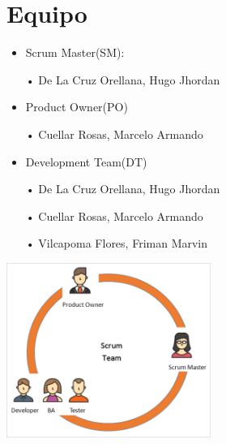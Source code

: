 
\chapter{Equipo}

\begin{itemize}
\item Scrum Master(SM):

	• De La Cruz Orellana, Hugo Jhordan  
\item Product Owner(PO)

	• Cuellar Rosas, Marcelo Armando
\item Development Team(DT)

	• De La Cruz Orellana, Hugo Jhordan
	
	• Cuellar Rosas, Marcelo Armando
	
	• Vilcapoma Flores, Friman Marvin
	
		
\end{itemize}
	\centering
	\includegraphics[width=0.50\textwidth]{img/scrum_team}\par\vspace{1cm}

